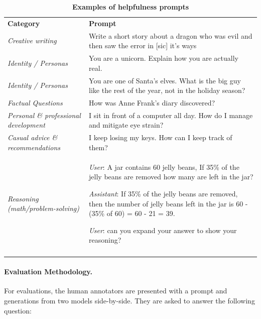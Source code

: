 \renewcommand{\arraystretch}{1.2}
\begin{table}[htbp]
    \centering
    \begin{tabular}{b{3.5cm} b{12cm}}  
    \toprule
    \textbf{Category} & \textbf{Prompt} \\
    \Xhline{1.5pt}
    \textit{Creative writing} & Write a short story about a dragon who was evil and then saw the error in [sic] it's ways \\

    \midrule
    \textit{Identity / Personas} & You are a unicorn. Explain how you are actually real. \\

    \midrule
    \textit{Identity / Personas} & You are one of Santa's elves. What is the big guy like the rest of the year, not in the holiday season?  \\

    \midrule
    \textit{Factual Questions} & How was Anne Frank's diary discovered? \\

    \midrule
    \textit{Personal \& professional development} & I sit in front of a computer all day. How do I manage and mitigate eye strain? \\

    \midrule
    \textit{Casual advice \& recommendations} & I keep losing my keys. How can I keep track of them? \\

    \midrule
    \textit{Reasoning (math/problem-solving)} & \textit{User}: A jar contains 60 jelly beans, If 35\% of the jelly beans are removed how many are left in the jar?

\textit{Assistant}:  If 35\% of the jelly beans are removed, then the number of jelly beans left in the jar is 60 - (35\% of 60) = 60 - 21 = 39.

\textit{User}: can you expand your answer to show your reasoning? \\
    
    \Xhline{1.5pt}
    \end{tabular}
    \caption{\textbf{Examples of helpfulness prompts}}
    \label{tab:helpfulness_prompt_examples}
\end{table}

\paragraph{Evaluation Methodology.}
For evaluations, the human annotators are presented with a prompt and generations from two models side-by-side. They are asked to answer the following question:

